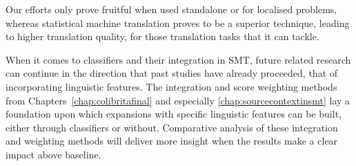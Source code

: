 Our efforts only prove fruitful when used standalone or for localised problems,
whereas statistical machine translation proves to be a superior technique,
leading to higher translation quality, for those translation tasks that it can
tackle.

When it comes to classifiers and their integration in SMT, future related
research can continue in the direction that past studies have already
proceeded, that of incorporating linguistic features. The integration and score
weighting methods from Chapters~\ref{chap:colibritafinal} and especially
\ref{chap:sourcecontextinsmt} lay a foundation upon which expansions with
specific linguistic features can be built, either through classifiers or
without.  Comparative analysis of these integration and weighting methods will
deliver more insight when the results make a clear impact above baseline. 




